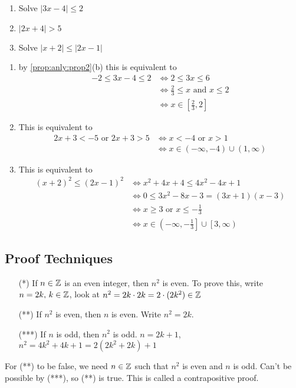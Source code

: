 \documentclass[10pt, a4paper]{article}
\begin{document}
\begin{example}
    \begin{enumerate}[label = (\alph*)]
        \item Solve $|3x - 4| \leq 2$
        \item $|2x + 4| > 5$
        \item Solve $|x + 2| \leq |2x - 1|$
    \end{enumerate}
    
    \begin{enumerate}[label = (\alph*)]
    \item
    by \autoref{prop:anly:prop2}(b) this is equivalent to
    \begin{align*}
    -2 \leq 3x - 4 \leq 2 &\iff 2 \leq 3x \leq 6 \\
    &\iff \frac{2}{3} \leq x \text{ and } x \leq 2 \\
    &\iff x \in \left[\frac{2}{3}, 2\right]
    \end{align*}

    \item
    This is equivalent to
    \begin{align*}
        2x + 3 < -5\text{ or }2x + 3 > 5 &\iff x < -4 \text{ or } x > 1 \\
        &\iff x \in (-\infty, -4) \cup (1, \infty)
    \end{align*}

    \item
    This is equivalent to
    \begin{align*}
        (x + 2) ^ 2 \leq (2x - 1) ^ 2 &\iff x ^ 2 + 4x + 4 \leq 4x ^ 2 - 4x + 1 \\
        &\iff 0 \leq 3x ^ 2 - 8x - 3 = (3x + 1)(x - 3) \\
        &\iff x \geq 3 \text{ or } x \leq -\frac{1}{3} \\
        &\iff x \in \left(-\infty, -\frac{1}{3}\right] \cup \left[3, \infty\right)
    \end{align*}
    \end{enumerate}
\end{example}

\subsection{Proof Techniques}
\begin{itemize}[label = *]
    \item[(*)] If $n \in \mathbb{Z}$ is an even integer, then $n ^ 2$ is even. To prove this, write $n = 2k,\, k \in \mathbb{Z}$, look at $n ^ 2 = 2k \cdot 2k = 2 \cdot (2k ^ 2) \in \mathbb{Z}$
    \item[(**)] If $n ^ 2$ is even, then $n$ is even. Write $n ^ 2 = 2k$.
    \item[(***)] If $n$ is odd, then $n ^ 2$ is odd.
    $n = 2k + 1$, $n ^ 2 = 4k ^ 2 + 4k + 1 = 2(2k ^ 2 + 2k) + 1$
\end{itemize}
For (**) to be false, we need $n \in \mathbb{Z}$ such that $n ^ 2$ is even and $n$ is odd. Can't be possible by (***), so (**) is true. This is called a contrapositive proof.
\end{document}
